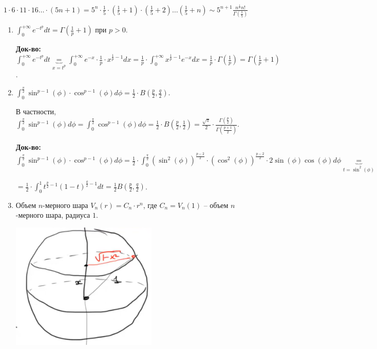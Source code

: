 \begin{example}
    $1\cdot 6 \cdot 11 \cdot 16 \dots \cdot (5n + 1) = 5^n \cdot \frac{1}{5} \cdot (\frac{1}{5} + 1) \cdot (\frac{1}{5} + 2) \dots (\frac{1}{5} + n) \sim 5^{n+1}\frac{n^{\frac{1}{5}}n!}{\Gamma(\frac{1}{5})}$
\end{example}

\begin{example}
    \begin{enumerate}
        \item {

            $\int_{0}^{+\infty} {e^{-t^p} dt} = \Gamma\left(\frac{1}{p} + 1\right)$ при $p > 0$.

            \textbf{Док-во:} $\int_{0}^{+\infty} {e^{-t^p} dt} \underbrace{=}_{x = t^p} \int_{0}^{+\infty} { e^{-x} \cdot \frac{1}{p} \cdot x^{\frac{1}{p} - 1} dx } = \frac{1}{p} \cdot \int_{0}^{+\infty} { x^{\frac{1}{p} - 1} e^{-x} dx } = \frac{1}{p} \cdot \Gamma\left(\frac{1}{p}\right) = \Gamma\left(\frac{1}{p} + 1\right)$.
        }
        \item {

            $\int_{0}^{\frac{\pi}{2}} { \sin^{p - 1}(\phi) \cdot \cos^{p - 1}(\phi) d \phi } = \frac{1}{2} \cdot B\left(\frac{p}{2}, \frac{q}{2}\right)$.

            В частности, $\int_{0}^{\frac{\pi}{2}} { \sin^{p - 1}(\phi) d \phi } = \int_{0}^{\frac{\pi}{2}} { \cos^{p - 1}(\phi) d \phi } = \frac{1}{2} \cdot B\left(\frac{p}{2}, \frac{1}{2}\right) = \frac{\sqrt{\pi}}{2} \cdot \frac{\Gamma\left(\frac{p}{2}\right)}{\Gamma\left(\frac{p + 1}{2}\right)}$.

            \textbf{Док-во:} $\int_{0}^{\frac{\pi}{2}} { \sin^{p - 1}(\phi) \cdot \cos^{p - 1}(\phi) d \phi } = \frac{1}{2} \cdot \int_{0}^{\frac{\pi}{2}} { \left(\sin^{2}(\phi)\right)^{\frac{p-2}{2}} \cdot \left(\cos^{2}(\phi)\right)^{\frac{p-2}{2}} \cdot 2 \sin(\phi) \cos(\phi) d \phi } \underbrace{=}_{t = \sin^2(\phi)}$
            
            $= \frac{1}{2} \cdot \int_{0}^{1} {t^{\frac{p}{2} - 1} (1 - t)^{\frac{q}{2} - 1} dt } = \frac{1}{2} B\left(\frac{p}{2}, \frac{q}{2}\right)$.  \newpage
        }
        \item {
            Объем $n$-мерного шара $V_n(r) = C_n \cdot r^n$, где $C_n = V_n(1)$ -- объем $n$-мерного шара, радиуса $1$.

            \begin{center}
                \includegraphics[width=7cm]{assets/03-intergrals-with-params/volume-of-n-dim-sphere.png}
            \end{center}

}
\end{enumerate}
\end{example}
